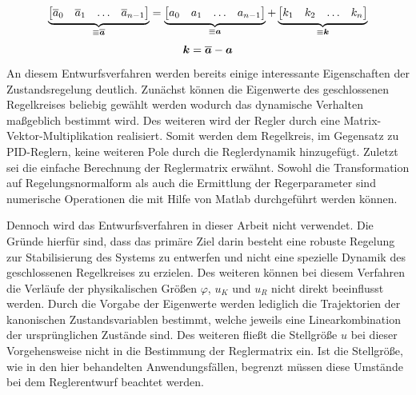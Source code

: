 \begin{equation}
\underbrace{
\begin{bmatrix}
\overline{a}_0 & \overline{a}_1 & \hdots &\overline{a}_{n-1}
\end{bmatrix}}_{\equiv \boldsymbol{\overline{a}}}
=
\underbrace{
\begin{bmatrix}
a_0 & a_1 & \hdots & a_{n-1}
\end{bmatrix}}_{\equiv \boldsymbol{a}}
+
\underbrace{
\begin{bmatrix}
k_1 & k_2 & \hdots & k_n
\end{bmatrix}}_{\equiv \boldsymbol{k}}
\end{equation}
\begin{equation}
\boldsymbol{k} = \boldsymbol{\overline{a}} - \boldsymbol{a}
\end{equation}
An diesem Entwurfsverfahren werden bereits einige interessante Eigenschaften der Zustandsregelung deutlich. Zunächst können die Eigenwerte des geschlossenen Regelkreises beliebig gewählt werden wodurch das dynamische Verhalten maßgeblich bestimmt wird. Des weiteren wird der Regler durch eine Matrix-Vektor-Multiplikation realisiert. Somit werden dem Regelkreis, im Gegensatz zu PID-Reglern, keine weiteren Pole durch die Reglerdynamik hinzugefügt. Zuletzt sei die einfache Berechnung der Reglermatrix erwähnt. Sowohl die Transformation auf Regelungsnormalform als auch die Ermittlung der Regerparameter sind numerische Operationen die mit Hilfe von Matlab durchgeführt werden können.

Dennoch wird das Entwurfsverfahren in dieser Arbeit nicht verwendet. Die Gründe hierfür sind, dass das primäre Ziel darin besteht eine robuste Regelung zur Stabilisierung des Systems zu entwerfen und nicht eine spezielle Dynamik des geschlossenen Regelkreises zu erzielen. Des weiteren können bei diesem Verfahren die Verläufe der physikalischen Größen $\varphi$, $u_K$ und $u_R$ nicht direkt beeinflusst werden. Durch die Vorgabe der Eigenwerte werden lediglich die Trajektorien der kanonischen Zustandsvariablen bestimmt, welche jeweils eine Linearkombination der ursprünglichen Zustände sind. Des weiteren fließt die Stellgröße $u$ bei dieser Vorgehensweise nicht in die Bestimmung der Reglermatrix ein. Ist die Stellgröße, wie in den hier behandelten Anwendungsfällen, begrenzt müssen diese Umstände bei dem Reglerentwurf beachtet werden.

